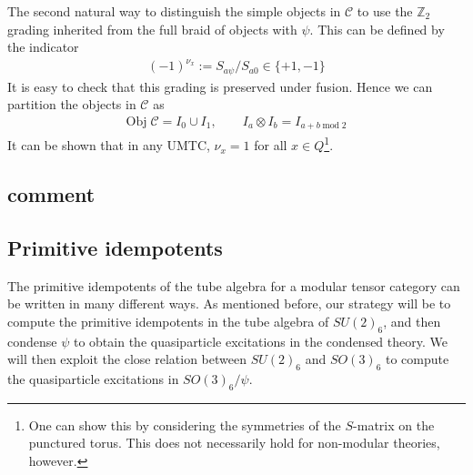 \documentclass[12pt,a4paper]{article}
\newcommand{\tp}{\otimes}
\newcommand{\mcc}{\mathcal{C}}
\begin{document}
The second natural way to distinguish the simple objects in $\mcc$ to use the $\mathbb{Z}_2$ 
grading inherited from the full braid of objects with $\psi$. 
This can be defined by the indicator 
\begin{align}
(-1)^{\nu_x} := S_{a \psi}/S_{a0} \in \{+1, -1 \}
\label{grading}
\end{align}
It is easy to check that this grading is preserved under fusion.
Hence we can partition the objects in $\mcc$ as 
\begin{align}
\text{Obj}\; \mathcal{C}  = I_0 \cup I_1, \quad \quad I_a \tp I_b = I_{a+b\; \text{mod} \; 2}
\end{align}
It can be shown that in any UMTC, $\nu_x = 1$ for all $x\in Q$\footnote{One can show this by 
considering the symmetries of the $S$-matrix on the punctured torus. This does not necessarily 
hold for non-modular theories, however.}. 
 
 


 
\subsection{comment}
\subsection{Primitive idempotents}
The primitive idempotents of the tube algebra for a modular tensor category can be written in many different ways. 
As mentioned before, our strategy will be to compute the primitive idempotents in the tube algebra of $SU(2)_6$, and then condense $\psi$ to obtain the quasiparticle excitations in the condensed theory. 
We will then exploit the close relation between $SU(2)_6$ and $SO(3)_6$ to compute the quasiparticle excitations in $SO(3)_6/\psi$.
\end{document}
